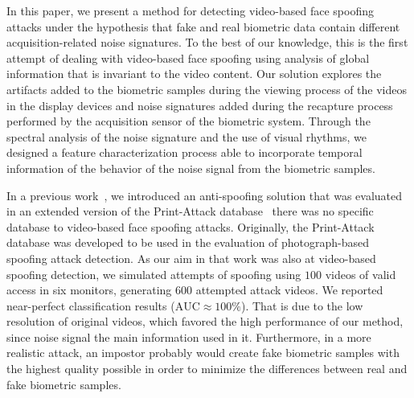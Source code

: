 \documentclass[journal]{IEEEtran}
\providecommand{\rv}[1]{{\protect\color{black}{#1}}}
\begin{document}
In this paper, we present a method for detecting video-based face spoofing attacks under the hypothesis that fake and real biometric data contain different acquisition-related noise signatures. To the best of our knowledge, this is the first attempt of dealing with video-based face spoofing using analysis of global information that is invariant to the video content. Our solution explores the artifacts added to the biometric samples during the viewing process of the videos in the display devices and noise signatures added during the recapture process performed by the acquisition sensor of the biometric system. Through the spectral analysis of the noise signature and the use of visual rhythms, we designed a feature characterization process able to incorporate temporal information of the behavior of the noise signal from the biometric samples.

In a previous work~\cite{Pinto:SIBGRAPI:2012}, we introduced an anti-spoofing solution that was evaluated in an extended version of the Print-Attack database~\cite{Anjos:IJCB:2011} \rv{given that, in the literature,} there was no specific database to video-based face spoofing attacks. Originally, the Print-Attack database was developed to be used in the evaluation of photograph-based spoofing attack detection. 
As our aim in that work was also at video-based spoofing detection, we simulated attempts of spoofing \rv{attacks} using $100$ videos of valid access in six monitors, generating $600$ attempted attack videos. We reported near-perfect classification results ($\textrm{AUC} \approx 100\%$). That is due to the low resolution of original videos, which favored the high performance of our method, since noise signal \rv{was} the main information used in it. Furthermore, in a more realistic attack, an impostor probably would create fake biometric samples with the highest quality possible in order to minimize the differences between real and fake biometric samples. 
\end{document}
